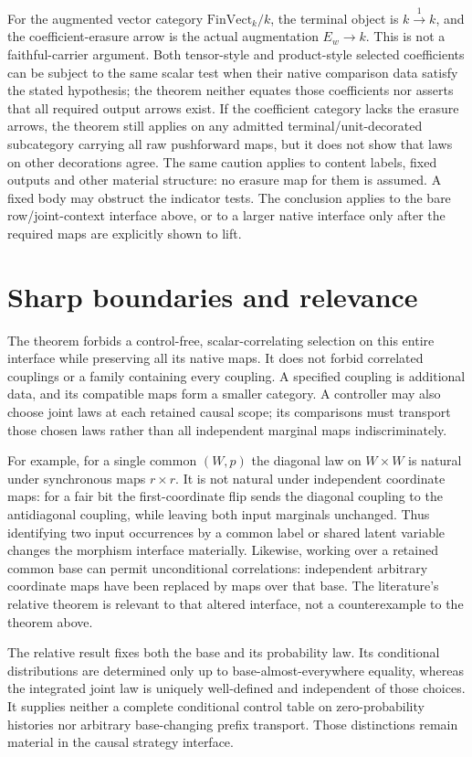 \documentclass{article}
\begin{document}
For the augmented vector category $\mathrm{FinVect}_k/k$, the terminal object
is $k\xrightarrow{1}k$, and the coefficient-erasure arrow is the actual
augmentation $E_w\to k$. This is not a faithful-carrier argument. Both
tensor-style and product-style selected coefficients can be subject to the
same scalar test when their native comparison data satisfy the stated
hypothesis; the theorem neither equates those coefficients nor asserts that
all required output arrows exist.
If the coefficient category lacks the erasure arrows, the theorem still
applies on any admitted terminal/unit-decorated subcategory carrying all raw
pushforward maps, but it does not show that laws on other decorations agree.
The same caution applies to content labels, fixed outputs and other material
structure: no erasure map for them is assumed. A fixed body may obstruct the
indicator tests. The conclusion applies to the bare row/joint-context
interface above, or to a larger native interface only after the required maps
are explicitly shown to lift.

\section{Sharp boundaries and relevance}
The theorem forbids a control-free, scalar-correlating selection on this
entire interface while preserving all its native maps. It does not forbid
correlated couplings or a family containing every coupling. A specified
coupling is additional data, and its compatible maps form a smaller category.
A controller may also choose joint laws at each retained causal scope; its
comparisons must transport those chosen laws rather than all independent
marginal maps indiscriminately.

For example, for a single common $(W,p)$ the diagonal law on $W\times W$
is natural under synchronous maps $r\times r$. It is not natural under
independent coordinate maps: for a fair bit the first-coordinate flip sends
the diagonal coupling to the antidiagonal coupling, while leaving both input
marginals unchanged. Thus identifying two input occurrences by a common label
or shared latent variable changes the morphism interface materially.
Likewise, working over a retained common base can permit unconditional
correlations: independent arbitrary coordinate maps have been replaced by
maps over that base. The literature's relative theorem is relevant to that
altered interface, not a counterexample to the theorem above.

The relative result fixes both the base and its probability law. Its
conditional distributions are determined only up to base-almost-everywhere
equality, whereas the integrated joint law is uniquely well-defined and
independent of those choices. It supplies neither a complete conditional
control table on zero-probability histories nor arbitrary base-changing
prefix transport. Those distinctions remain material in the causal strategy
interface.
\end{document}
